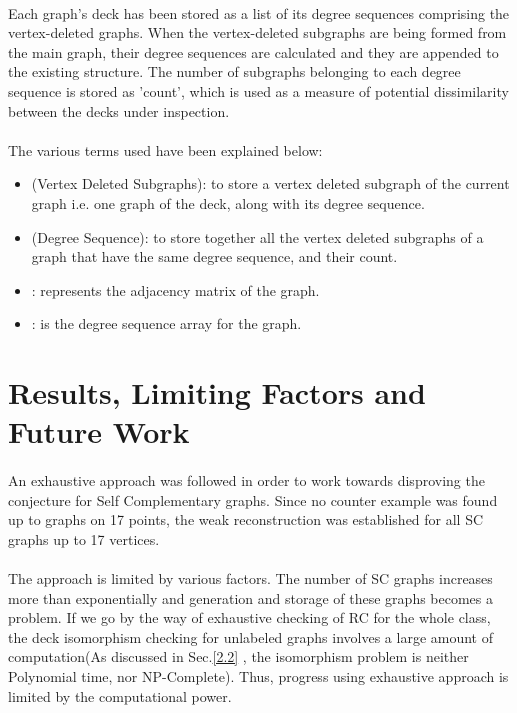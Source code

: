 \documentclass[12pt,conference]{IEEEtran}
\begin{document}
\paragraph*{} Each graph's deck has been stored as a list of its degree sequences comprising the vertex-deleted graphs. When the vertex-deleted subgraphs are being formed from the main graph, their degree sequences are calculated and they are appended to the existing structure. The number of subgraphs belonging to each degree sequence is stored as 'count', which is used as a measure of potential dissimilarity between the decks under inspection. 
\paragraph*{} The various terms used have been explained below: 
\begin{itemize}
\item  (Vertex Deleted Subgraphs): to store a vertex deleted subgraph of the current graph i.e. one graph of the deck, along with its degree sequence.
\item  (Degree Sequence): to store together all the vertex deleted subgraphs of a graph that have the same degree sequence, and their count. 
\item : represents the adjacency matrix of the graph. 
\item : is the degree sequence array for the graph. 
\end{itemize}





\section{ Results, Limiting Factors and  Future Work }
\paragraph*{} An exhaustive approach was followed in order to work towards disproving the conjecture for Self Complementary graphs. Since no counter example was found up to graphs on 17 points, the weak reconstruction was established for all SC graphs up to 17 vertices. 
\paragraph*{} The approach is limited by various factors. The number of SC graphs increases more than exponentially and generation and storage of these graphs becomes a problem. If we go by the way of exhaustive checking of RC for the whole class, the deck isomorphism checking for unlabeled graphs involves a large amount of computation(As discussed in Sec.\ref{2.2} , the isomorphism problem is neither Polynomial time, nor NP-Complete). Thus, progress using exhaustive approach is limited by the computational power. 
\end{document}
